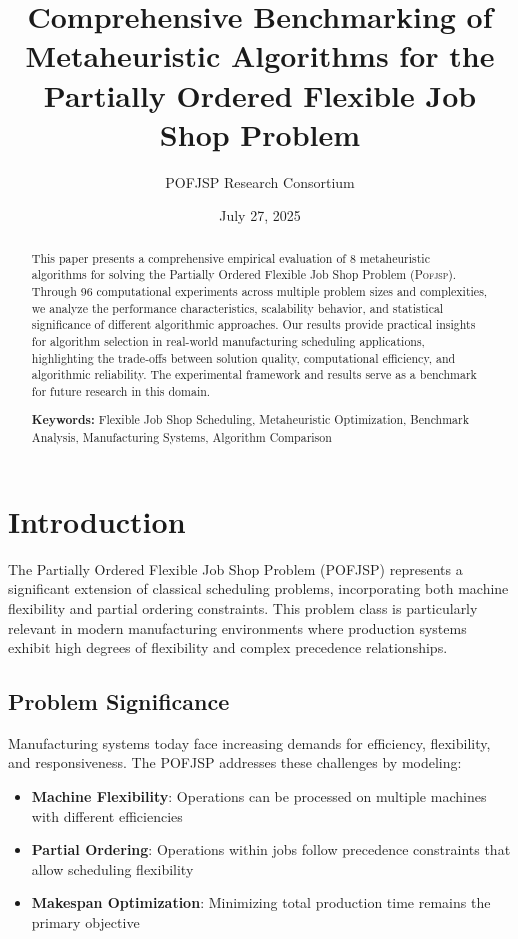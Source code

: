 \documentclass[11pt,twocolumn]{article}
\title{Comprehensive Benchmarking of Metaheuristic Algorithms for the Partially Ordered Flexible Job Shop Problem}
\author{POFJSP Research Consortium}
\date{July 27, 2025}
\newcommand{\pofjsp}{\textsc{Pofjsp}}
\begin{document}
\maketitle

\begin{abstract}
This paper presents a comprehensive empirical evaluation of 8 metaheuristic algorithms for solving the Partially Ordered Flexible Job Shop Problem (\pofjsp). Through 96 computational experiments across multiple problem sizes and complexities, we analyze the performance characteristics, scalability behavior, and statistical significance of different algorithmic approaches. Our results provide practical insights for algorithm selection in real-world manufacturing scheduling applications, highlighting the trade-offs between solution quality, computational efficiency, and algorithmic reliability. The experimental framework and results serve as a benchmark for future research in this domain.

\textbf{Keywords:} Flexible Job Shop Scheduling, Metaheuristic Optimization, Benchmark Analysis, Manufacturing Systems, Algorithm Comparison
\end{abstract}


\section{Introduction}

The Partially Ordered Flexible Job Shop Problem (POFJSP) represents a significant extension of classical scheduling problems, incorporating both machine flexibility and partial ordering constraints. This problem class is particularly relevant in modern manufacturing environments where production systems exhibit high degrees of flexibility and complex precedence relationships.

\subsection{Problem Significance}

Manufacturing systems today face increasing demands for efficiency, flexibility, and responsiveness. The POFJSP addresses these challenges by modeling:

\begin{itemize}
    \item \textbf{Machine Flexibility}: Operations can be processed on multiple machines with different efficiencies
    \item \textbf{Partial Ordering}: Operations within jobs follow precedence constraints that allow scheduling flexibility
    \item \textbf{Makespan Optimization}: Minimizing total production time remains the primary objective
\end{itemize}
\end{document}
